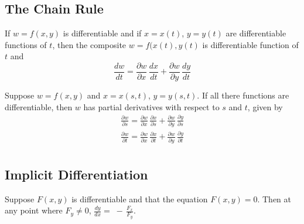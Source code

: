 \documentclass[aima331_lecturenotes_ku.tex]{subfiles}
\begin{document}
\subsection{The Chain Rule}
\begin{theorem}
  If \(w=f(x,y)\) is differentiable and if \(x=x(t)\), \(y=y(t)\) are differentiable functions of \(t\), then the composite \(w=f(x(t),y(t)\) is differentiable function of \(t\) and \[\frac{dw}{dt} = \frac{\partial w}{\partial x}\, \frac{dx}{dt} + \frac{\partial w}{\partial y}\, \frac{dy}{dt}\]
\end{theorem}

\begin{theorem}
  Suppose \(w=f(x,y)\) and \(x=x(s,t)\), \(y=y(s,t)\). If all there functions are differentiable, then \(w\) has partial derivatives with respect to \(s\) and \(t\), given by
  \begin{gather*}
    \frac{\partial w}{\partial s} = \frac{\partial w}{\partial x}\, \frac{\partial x}{\partial s} + \frac{\partial w}{\partial y}\, \frac{\partial y}{\partial s} \\[2mm]
    \frac{\partial w}{\partial t} = \frac{\partial w}{\partial x}\, \frac{\partial x}{\partial t} + \frac{\partial w}{\partial y}\, \frac{\partial y}{\partial t} \\[2mm]
  \end{gather*}
\end{theorem}

\subsection{Implicit Differentiation}
\begin{theorem}
  Suppose \(F(x,y)\) is differentiable and that the equation \(F(x,y)=0\). Then at any point where \(F_y \neq 0\), \hspace{5mm} \(\displaystyle \frac{dy}{dx}= \; - \, \frac{F_x}{F_y}\).
\end{theorem}
\end{document}
